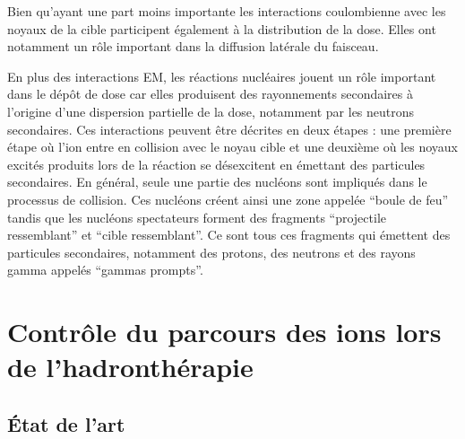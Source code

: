 \documentclass[11pt,a4paper,oldfontcommands]{memoir}
\begin{document}
Bien qu'ayant une part moins importante les interactions coulombienne avec les noyaux de la cible participent également à la distribution de la dose. Elles ont notamment un rôle important dans la diffusion latérale du faisceau.

En plus des interactions EM, les réactions nucléaires jouent un rôle important dans le dépôt de dose car elles produisent des rayonnements secondaires à l'origine d'une dispersion partielle de la dose, notamment par les neutrons secondaires. Ces interactions peuvent être décrites en deux étapes : une première étape où l'ion entre en collision avec le noyau cible et une deuxième où les noyaux excités produits lors de la réaction se désexcitent en émettant des particules secondaires. En général, seule une partie des nucléons sont impliqués dans le processus de collision. Ces nucléons créent ainsi une zone appelée \enquote{boule de feu} tandis que les nucléons spectateurs forment des fragments \enquote{projectile ressemblant} et \enquote{cible ressemblant}. Ce sont tous ces fragments qui émettent des particules secondaires, notamment des protons, des neutrons et des rayons gamma appelés \enquote{gammas prompts}. %


\openany
\section{Contrôle du parcours des ions lors de l'hadronthérapie}

\subsection{\'Etat de l'art}
\end{document}
